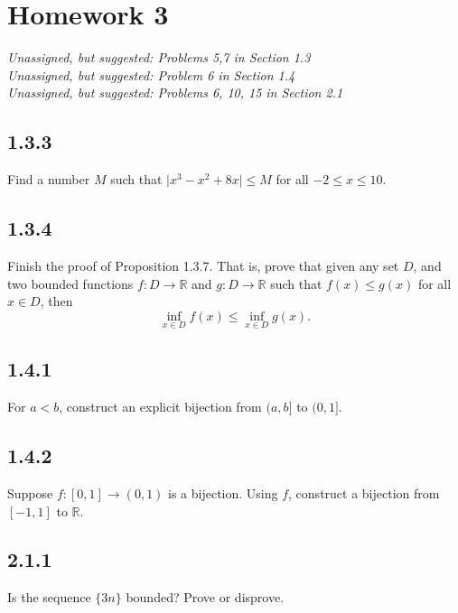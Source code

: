 \documentclass{article}
\newcommand{\hwnum}{3}
\newcommand{\unassigned}{
\flushleft
Unassigned, but suggested: Problems 5,7 in Section 1.3 \\
Unassigned, but suggested: Problem 6 in Section 1.4 \\
Unassigned, but suggested: Problems 6, 10, 15 in Section 2.1
}
\newcommand{\R}{{\mathbb{R}}}
\newcommand{\sabs}[1]{\lvert {#1} \rvert}
\begin{document}
\setcounter{section}{2}
\section{Homework \hwnum}
\emph{ \unassigned}

\subsection{1.3.3} Find a number $M$ such that $\sabs{x^3-x^2+8x} \leq M$ for all $-2 \leq x \leq 10$.
\mysolution{

} %


\subsection{1.3.4}Finish the proof of Proposition 1.3.7.
That is, prove that
given any set $D$,
and two bounded functions
$f \colon D \to \R$ and $g \colon D \to \R$ 
such that $f(x) \leq g(x)$ for all $x \in D$, then 
\begin{equation*}
\inf_{x\in D} f(x) \leq \inf_{x\in D} g(x) .
\end{equation*}

\mysolution{

} %


\subsection{1.4.1}For $a < b$, construct an explicit bijection from $(a,b]$ to $(0,1]$.
\mysolution{

} %


\subsection{1.4.2}Suppose $f \colon [0,1] \to (0,1)$ is a bijection.
Using $f$, construct a
bijection from $[-1,1]$ to $\R$.

\mysolution{

} %

\subsection{2.1.1}
Is the sequence
$\{ 3n \}$
bounded?  Prove or disprove.
\mysolution{

} %
\end{document}
